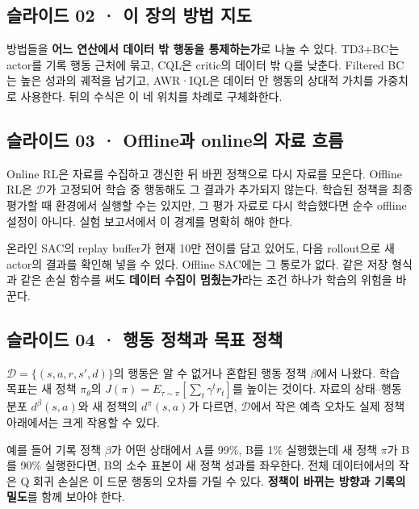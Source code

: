 \documentclass[11pt,a4paper]{article}
\begin{document}
\subsection{슬라이드 02 · 이 장의 방법 지도}

방법들을 \textbf{어느 연산에서 데이터 밖 행동을 통제하는가}로 나눌 수 있다. TD3+BC는 actor를 기록 행동 근처에 묶고, CQL은 critic의 데이터 밖 Q를 낮춘다. Filtered BC는 높은 성과의 궤적을 남기고, AWR·IQL은 데이터 안 행동의 상대적 가치를 가중치로 사용한다. 뒤의 수식은 이 네 위치를 차례로 구체화한다.\par

\subsection{슬라이드 03 · Offline과 online의 자료 흐름}

Online RL은 자료를 수집하고 갱신한 뒤 바뀐 정책으로 다시 자료를 모은다. Offline RL은 $\mathcal D$가 고정되어 학습 중 행동해도 그 결과가 추가되지 않는다. 학습된 정책을 최종 평가할 때 환경에서 실행할 수는 있지만, 그 평가 자료로 다시 학습했다면 순수 offline 설정이 아니다. 실험 보고서에서 이 경계를 명확히 해야 한다.\par

온라인 SAC의 replay buffer가 현재 10만 전이를 담고 있어도, 다음 rollout으로 새 actor의 결과를 확인해 넣을 수 있다. Offline SAC에는 그 통로가 없다. 같은 저장 형식과 같은 손실 함수를 써도 \textbf{데이터 수집이 멈췄는가}라는 조건 하나가 학습의 위험을 바꾼다.\par

\subsection{슬라이드 04 · 행동 정책과 목표 정책}

$\mathcal D=\{(s,a,r,s',d)\}$의 행동은 알 수 없거나 혼합된 행동 정책 $\beta$에서 나왔다. 학습 목표는 새 정책 $\pi_\theta$의 $J(\pi)=E_{\tau\sim\pi}[\sum_t\gamma^t r_t]$를 높이는 것이다. 자료의 상태–행동 분포 $d^\beta(s,a)$와 새 정책의 $d^\pi(s,a)$가 다르면, $\mathcal D$에서 작은 예측 오차도 실제 정책 아래에서는 크게 작용할 수 있다.\par

예를 들어 기록 정책 $\beta$가 어떤 상태에서 A를 99\%, B를 1\% 실행했는데 새 정책 $\pi$가 B를 90\% 실행한다면, B의 소수 표본이 새 정책 성과를 좌우한다. 전체 데이터에서의 작은 Q 회귀 손실은 이 드문 행동의 오차를 가릴 수 있다. \textbf{정책이 바뀌는 방향과 기록의 밀도}를 함께 보아야 한다.\par
\end{document}
